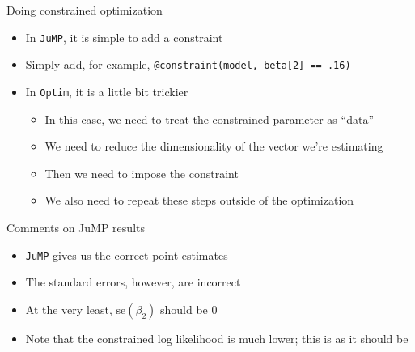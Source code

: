 \documentclass[aspectratio=169]{beamer}
\begin{document}
\begin{frame}

Doing constrained optimization

\bigskip{}

\begin{itemize}
\itemsep1.5em
\item<2-> In \texttt{JuMP}, it is simple to add a constraint
\item<3-> Simply add, for example, \texttt{@constraint(model, beta[2] == .16)}
\item<4-> In \texttt{Optim}, it is a little bit trickier
\bigskip\par
\begin{itemize}
\itemsep1.5em
\item<5-> In this case, we need to treat the constrained parameter as ``data''
\item<6-> We need to reduce the dimensionality of the vector we're estimating
\item<7-> Then we need to impose the constraint
\item<8-> We also need to repeat these steps outside of the optimization
\end{itemize}
\end{itemize}

\end{frame}

\begin{frame}

Comments on JuMP results

\bigskip{}

\begin{itemize}
\itemsep1.5em
\item<2-> \texttt{JuMP} gives us the correct point estimates
\item<3-> The standard errors, however, are incorrect
\item<4-> At the very least, $\text{se}(\beta_2)$ should be 0
\item<5-> Note that the constrained log likelihood is much lower; this is as it should be
\end{itemize}

\end{frame}
\end{document}
